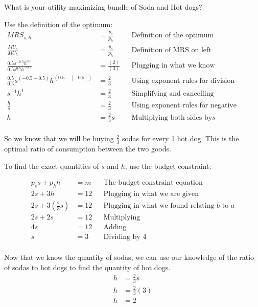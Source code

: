 \documentclass[12 pt]{exam}
\begin{document}
\begin{questions}
  \question What is your utility-maximizing bundle of Soda and Hot dogs?
  \begin{solution}
  	Use the definition of the optimum: 
\begin{align*}
MRS_{s,h}&=\frac{p_s}{p_h} & & \text{Definition of the optimum}\\
\frac{MU_s}{MU_h}&=\frac{p_s}{p_h} && \text{Definition of MRS on left}\\
\frac{0.5s^{-0.5}h^{0.5}}{0.5s^{0.5}h^{-0.5}}&=\frac{(2)}{(3)} & & \text{Plugging in what we know}\\
		\frac{0.5}{0.5}s^{(-0.5-0.5)}h^{(0.5-[-0.5])} &=\frac{2}{3} && \text{Using exponent rules for division}\\
		s^{-1}h^{1} &=\frac{2}{3} && \text{Simplifying and cancelling}\\
		\frac{h}{s}&=\frac{2}{3} && \text{Using exponent rules for negative exponents}\\
	h&=\frac{2}{3}s && \text{Multiplying both sides by} s\\	
\end{align*}

So we know that we will be buying $\frac{2}{3}$ sodas for every 1 hot dog. This is the optimal ratio of consumption between the two goods. 

To find the exact quantities of $s$ and $h$, use the budget constraint:

\begin{align*}
p_ss +p_hh &=m & & \text{The budget constraint equation}\\
2s + 3h &=12 & & \text{Plugging in what we are given}\\
2s + 3(\frac{2}{3}s)&=12 & & \text{Plugging in what we found relating }b \text{ to } a\\
2s+2s&=12 & & \text{Multiplying}\\
4s&=12 & & \text{Adding}\\
s&=3 & & \text{Dividing by } 4\\	
\end{align*}

Now that we know the quantity of sodas, we can use our knowledge of the ratio of sodas to hot dogs to find the quantity of hot dogs. 
\begin{align*}
h&=\frac{2}{3}s\\
h&=\frac{2}{3}(3)\\
h&=2\\ 	
\end{align*}


\end{solution}
\end{questions}
\end{document}
